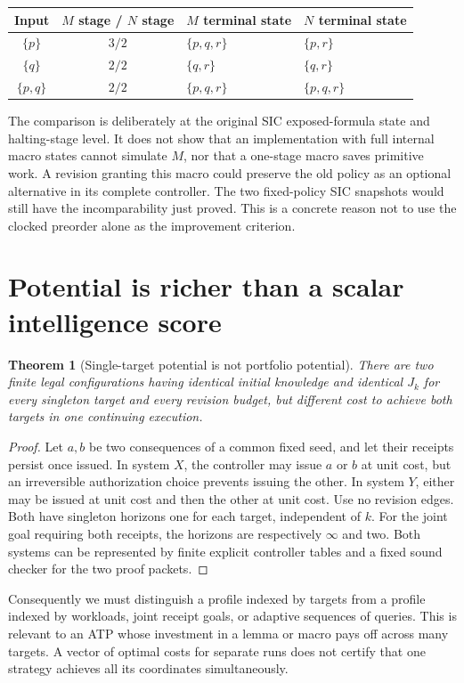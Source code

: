 \documentclass[11pt]{article}
\newtheorem{theorem}{Theorem}[section]
\theoremstyle{remark}\newtheorem{remark}[theorem]{Remark}
\begin{document}
\begin{center}
\begin{tabular}{ccll}
\toprule Input & $M$ stage / $N$ stage & $M$ terminal state & $N$ terminal state\\\midrule
$\{p\}$ & $3/2$ & $\{p,q,r\}$ & $\{p,r\}$\\
$\{q\}$ & $2/2$ & $\{q,r\}$ & $\{q,r\}$\\
$\{p,q\}$ & $2/2$ & $\{p,q,r\}$ & $\{p,q,r\}$\\\bottomrule
\end{tabular}
\end{center}
The comparison is deliberately at the original SIC exposed-formula state and halting-stage level. It does not show that an implementation with full internal macro states cannot simulate $M$, nor that a one-stage macro saves primitive work. A revision granting this macro could preserve the old policy as an optional alternative in its complete controller. The two fixed-policy SIC snapshots would still have the incomparability just proved. This is a concrete reason not to use the clocked preorder alone as the improvement criterion.

\section{Potential is richer than a scalar intelligence score}
\begin{theorem}[Single-target potential is not portfolio potential]\label{thm:portfolio}
There are two finite legal configurations having identical initial knowledge and identical $J_k$ for every singleton target and every revision budget, but different cost to achieve both targets in one continuing execution.
\end{theorem}
\begin{proof}
Let $a,b$ be two consequences of a common fixed seed, and let their receipts persist once issued. In system $X$, the controller may issue $a$ or $b$ at unit cost, but an irreversible authorization choice prevents issuing the other. In system $Y$, either may be issued at unit cost and then the other at unit cost. Use no revision edges. Both have singleton horizons one for each target, independent of $k$. For the joint goal requiring both receipts, the horizons are respectively $\infty$ and two. Both systems can be represented by finite explicit controller tables and a fixed sound checker for the two proof packets.
\end{proof}
Consequently we must distinguish a profile indexed by targets from a profile indexed by workloads, joint receipt goals, or adaptive sequences of queries. This is relevant to an ATP whose investment in a lemma or macro pays off across many targets. A vector of optimal costs for separate runs does not certify that one strategy achieves all its coordinates simultaneously.
\end{document}
